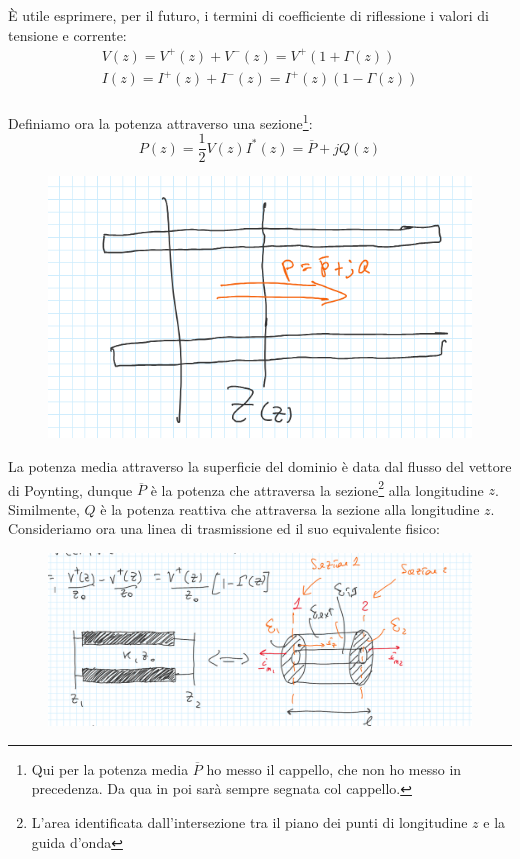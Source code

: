 \documentclass{book}
\begin{document}
        È utile esprimere, per il futuro, i termini di coefficiente di riflessione i valori di
        tensione e corrente:
        \begin{align}
            \label{eqn:eq_VI_Gamma}
            V(z)=V^{+}(z)+V^{-}(z)=V^{+}(1+\Gamma (z))  \\
            I(z)=I^{+}(z)+I^{-}(z)=I^{+}(z)(1-\Gamma (z))
        \end{align}
        \\ Definiamo ora la potenza attraverso una sezione\footnote{Qui per la potenza media $\overline{P}$ ho messo il cappello, che non ho messo in precedenza. Da qua in poi sarà sempre segnata col cappello.}:
        \begin{equation}
            P(z)=\frac{1}{2}V(z)I^{*}(z) = \overline{P}+jQ(z)
        \end{equation}
        \begin{figure}[h!]
            \center  
            \includegraphics[width=0.75\linewidth]{Chapter_two/Chapt2img5.png}
        \end{figure}
        La potenza media attraverso la superficie del dominio è data dal flusso del vettore di Poynting, dunque $\overline{P}$ è 
        la potenza che attraversa la sezione\footnote{L'area identificata dall'intersezione tra il piano dei punti di longitudine $z$ e la guida d'onda} alla longitudine $z$. Similmente, $Q$ è la potenza reattiva che attraversa la sezione alla longitudine $z$.
         \newpage
        Consideriamo ora una linea di trasmissione ed il suo equivalente fisico:
        \begin{figure}
            \center 
            \includegraphics[width=0.75\linewidth]{Chapter_two/Chapt2img7.png}
        \end{figure}
\end{document}
